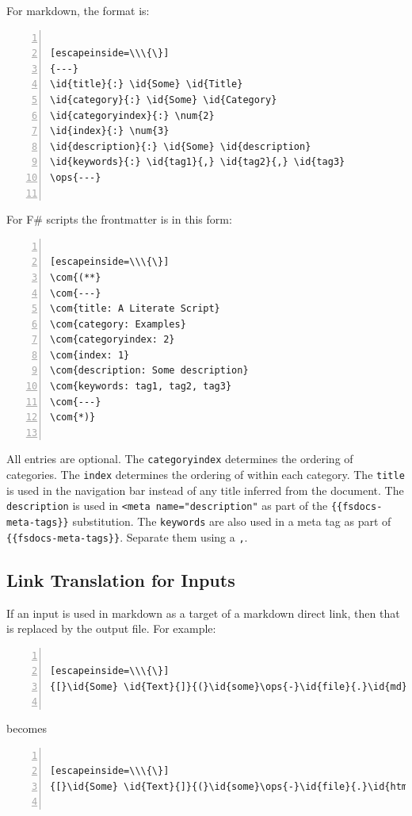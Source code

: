 \documentclass{article}
\newcommand{\id}[1]{\textcolor{black}{#1}}
\newcommand{\com}[1]{\textcolor{officegreen}{#1}}
\newcommand{\num}[1]{\textcolor{officegreen}{#1}}
\newcommand{\ops}[1]{\textcolor{purple}{#1}}
\begin{document}
For markdown, the format is:
\begin{lstlisting}[numbers=left]

[escapeinside=\\\{\}]
{---}
\id{title}{:} \id{Some} \id{Title}
\id{category}{:} \id{Some} \id{Category}
\id{categoryindex}{:} \num{2}
\id{index}{:} \num{3}
\id{description}{:} \id{Some} \id{description}
\id{keywords}{:} \id{tag1}{,} \id{tag2}{,} \id{tag3}
\ops{---}


\end{lstlisting}



For F\# scripts the frontmatter is in this form:
\begin{lstlisting}[numbers=left]

[escapeinside=\\\{\}]
\com{(**}
\com{---}
\com{title: A Literate Script}
\com{category: Examples}
\com{categoryindex: 2}
\com{index: 1}
\com{description: Some description}
\com{keywords: tag1, tag2, tag3}
\com{---}
\com{*)}


\end{lstlisting}



All entries are optional.
The \texttt{categoryindex} determines the ordering of categories.
The \texttt{index} determines the ordering of within each category.
The \texttt{title} is used in the navigation bar instead of any title inferred from the document.
The \texttt{description} is used in \texttt{<meta name="description"} as part of the \texttt{\{\{fsdocs-meta-tags\}\}} substitution.
The \texttt{keywords} are also used in a meta tag as part of \texttt{\{\{fsdocs-meta-tags\}\}}. Separate them using a \texttt{,}.
\subsection*{Link Translation for Inputs}



If an input is used in markdown as a target of a markdown direct link, then that is replaced by the output file. For example:
\begin{lstlisting}[numbers=left]

[escapeinside=\\\{\}]
{[}\id{Some} \id{Text}{]}{(}\id{some}\ops{-}\id{file}{.}\id{md}{)}


\end{lstlisting}



becomes
\begin{lstlisting}[numbers=left]

[escapeinside=\\\{\}]
{[}\id{Some} \id{Text}{]}{(}\id{some}\ops{-}\id{file}{.}\id{html}{)}


\end{lstlisting}
\end{document}
